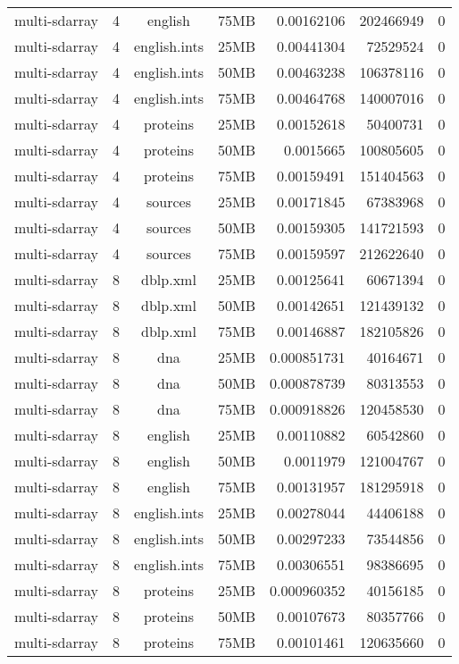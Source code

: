 \begin{table}[h]
\begin{center}
\begin{tabular}{ccccrrr}
multi-sdarray & 4 & english & 75MB & 0.00162106 & 202466949 & 0 \\
multi-sdarray & 4 & english.ints & 25MB & 0.00441304 & 72529524 & 0 \\
multi-sdarray & 4 & english.ints & 50MB & 0.00463238 & 106378116 & 0 \\
multi-sdarray & 4 & english.ints & 75MB & 0.00464768 & 140007016 & 0 \\
multi-sdarray & 4 & proteins & 25MB & 0.00152618 & 50400731 & 0 \\
multi-sdarray & 4 & proteins & 50MB & 0.0015665 & 100805605 & 0 \\
multi-sdarray & 4 & proteins & 75MB & 0.00159491 & 151404563 & 0 \\
multi-sdarray & 4 & sources & 25MB & 0.00171845 & 67383968 & 0 \\
multi-sdarray & 4 & sources & 50MB & 0.00159305 & 141721593 & 0 \\
multi-sdarray & 4 & sources & 75MB & 0.00159597 & 212622640 & 0 \\
multi-sdarray & 8 & dblp.xml & 25MB & 0.00125641 & 60671394 & 0 \\
multi-sdarray & 8 & dblp.xml & 50MB & 0.00142651 & 121439132 & 0 \\
multi-sdarray & 8 & dblp.xml & 75MB & 0.00146887 & 182105826 & 0 \\
multi-sdarray & 8 & dna & 25MB & 0.000851731 & 40164671 & 0 \\
multi-sdarray & 8 & dna & 50MB & 0.000878739 & 80313553 & 0 \\
multi-sdarray & 8 & dna & 75MB & 0.000918826 & 120458530 & 0 \\
multi-sdarray & 8 & english & 25MB & 0.00110882 & 60542860 & 0 \\
multi-sdarray & 8 & english & 50MB & 0.0011979 & 121004767 & 0 \\
multi-sdarray & 8 & english & 75MB & 0.00131957 & 181295918 & 0 \\
multi-sdarray & 8 & english.ints & 25MB & 0.00278044 & 44406188 & 0 \\
multi-sdarray & 8 & english.ints & 50MB & 0.00297233 & 73544856 & 0 \\
multi-sdarray & 8 & english.ints & 75MB & 0.00306551 & 98386695 & 0 \\
multi-sdarray & 8 & proteins & 25MB & 0.000960352 & 40156185 & 0 \\
multi-sdarray & 8 & proteins & 50MB & 0.00107673 & 80357766 & 0 \\
multi-sdarray & 8 & proteins & 75MB & 0.00101461 & 120635660 & 0 \\

\end{tabular}
\end{center}
\end{table}
